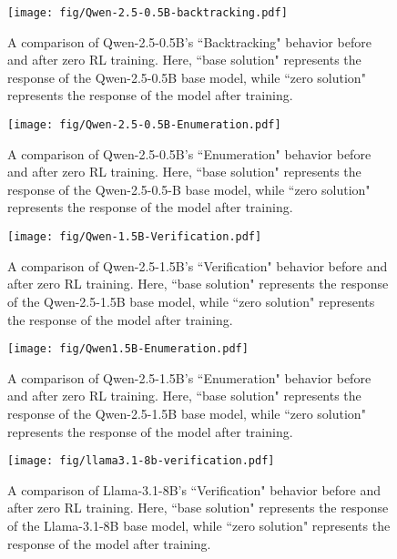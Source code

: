 \begin{figure}[!t]
        \centering
\texttt{[image: fig/Qwen-2.5-0.5B-backtracking.pdf]}
\caption{A comparison of Qwen-2.5-0.5B’s ``Backtracking" behavior before and after zero RL training. Here, ``base solution" represents the response of the Qwen-2.5-0.5B base model,
while ``zero solution" represents the response of the model after training.}
        \label{fig:qwen0.5b_base_backtracking}
\end{figure}



\begin{figure}[!t]
        \centering
\texttt{[image: fig/Qwen-2.5-0.5B-Enumeration.pdf]}
\caption{A comparison of Qwen-2.5-0.5B’s ``Enumeration" behavior before and after zero RL training. Here, ``base solution" represents the response of the Qwen-2.5-0.5-B base model,
while ``zero solution" represents the response of the model after training.}
        \label{fig:qwen0.5b_base_enumeration}
\end{figure}



\begin{figure}[!t]
        \centering
\texttt{[image: fig/Qwen-1.5B-Verification.pdf]}
\caption{A comparison of Qwen-2.5-1.5B’s ``Verification" behavior before and after zero RL training. Here, ``base solution" represents the response of the Qwen-2.5-1.5B base model,
while ``zero solution" represents the response of the model after training.}
        \label{fig:qwen1.5b_base_verification}
\end{figure}


\begin{figure}[!t]
        \centering
\texttt{[image: fig/Qwen1.5B-Enumeration.pdf]}
\caption{A comparison of Qwen-2.5-1.5B’s ``Enumeration" behavior before and after zero RL training. Here, ``base solution" represents the response of the Qwen-2.5-1.5B base model,
while ``zero solution" represents the response of the model after training.}
        \label{fig:qwen1.5b_base_enumeration}
\end{figure}


\begin{figure}[!t]
        \centering
\texttt{[image: fig/llama3.1-8b-verification.pdf]}
\caption{A comparison of Llama-3.1-8B’s ``Verification" behavior before and after zero RL training. Here, ``base solution" represents the response of the Llama-3.1-8B base model,
while ``zero solution" represents the response of the model after training.}
        \label{fig:llama3.1-8b_base_verification}
\end{figure}



